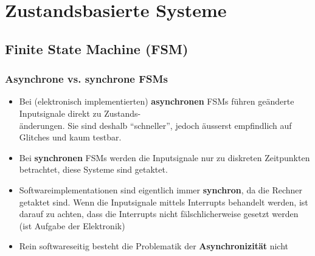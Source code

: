 \section{Zustandsbasierte Systeme}

\subsection{Finite State Machine (FSM)}
\subsubsection{Asynchrone vs. synchrone FSMs}
\begin{itemize}
  \item Bei (elektronisch implementierten) \textbf{asynchronen} FSMs führen geänderte Inputsignale direkt zu Zustands-\\änderungen. Sie sind deshalb "`schneller"', jedoch äusserst empfindlich auf Glitches und kaum testbar.
  \item Bei \textbf{synchronen} FSMs werden die Inputsignale nur zu diskreten Zeitpunkten betrachtet, diese Systeme sind getaktet.
  \item Softwareimplementationen sind eigentlich immer \textbf{synchron}, da die Rechner getaktet sind. Wenn die Inputsignale mittels Interrupts behandelt werden, ist darauf zu achten, dass die Interrupts nicht fälschlicherweise gesetzt werden (ist Aufgabe der Elektronik)
  \item Rein softwareseitig besteht die Problematik der \textbf{Asynchronizität} nicht
\end{itemize}

